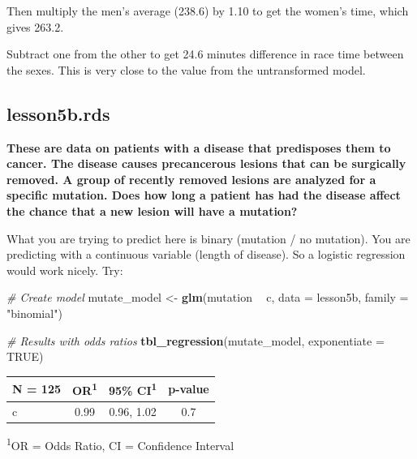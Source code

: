 \documentclass[]{book}
\newenvironment{Shaded}{\begin{snugshade}}{\end{snugshade}}
\newcommand{\CommentTok}[1]{\textcolor[rgb]{0.56,0.35,0.01}{\textit{#1}}}
\newcommand{\DataTypeTok}[1]{\textcolor[rgb]{0.13,0.29,0.53}{#1}}
\newcommand{\KeywordTok}[1]{\textcolor[rgb]{0.13,0.29,0.53}{\textbf{#1}}}
\newcommand{\NormalTok}[1]{#1}
\newcommand{\OperatorTok}[1]{\textcolor[rgb]{0.81,0.36,0.00}{\textbf{#1}}}
\newcommand{\OtherTok}[1]{\textcolor[rgb]{0.56,0.35,0.01}{#1}}
\newcommand{\StringTok}[1]{\textcolor[rgb]{0.31,0.60,0.02}{#1}}
\begin{document}
Then multiply the men's average (238.6) by 1.10 to get the women's time, which gives 263.2.

Subtract one from the other to get 24.6 minutes difference in race time between the sexes. This is very close to the value from the untransformed model.

\hypertarget{lesson5b.rds}{%
\subsection{lesson5b.rds}\label{lesson5b.rds}}

\textbf{These are data on patients with a disease that predisposes them to cancer. The disease causes precancerous lesions that can be surgically removed. A group of recently removed lesions are analyzed for a specific mutation. Does how long a patient has had the disease affect the chance that a new lesion will have a mutation?}

What you are trying to predict here is binary (mutation / no mutation). You are predicting with a continuous variable (length of disease). So a logistic regression would work nicely. Try:

\begin{Shaded}
\begin{Highlighting}[]
\CommentTok{# Create model}
\NormalTok{mutate_model <-}\StringTok{ }\KeywordTok{glm}\NormalTok{(mutation }\OperatorTok{~}\StringTok{ }\NormalTok{c, }\DataTypeTok{data =}\NormalTok{ lesson5b, }\DataTypeTok{family =} \StringTok{"binomial"}\NormalTok{)}

\CommentTok{# Results with odds ratios}
\KeywordTok{tbl_regression}\NormalTok{(mutate_model, }\DataTypeTok{exponentiate =} \OtherTok{TRUE}\NormalTok{)}
\end{Highlighting}
\end{Shaded}

\captionsetup[table]{labelformat=empty,skip=1pt}
\begin{longtable}{lccc}
\toprule
\textbf{N = 125} & \textbf{OR}\textsuperscript{1} & \textbf{95\% CI}\textsuperscript{1} & \textbf{p-value} \\ 
\midrule
c & 0.99 & 0.96, 1.02 & 0.7 \\ 
\bottomrule
\end{longtable}
\vspace{-5mm}
\begin{minipage}{\linewidth}
\textsuperscript{1}OR = Odds Ratio, CI = Confidence Interval \\ 
\end{minipage}
\end{document}
